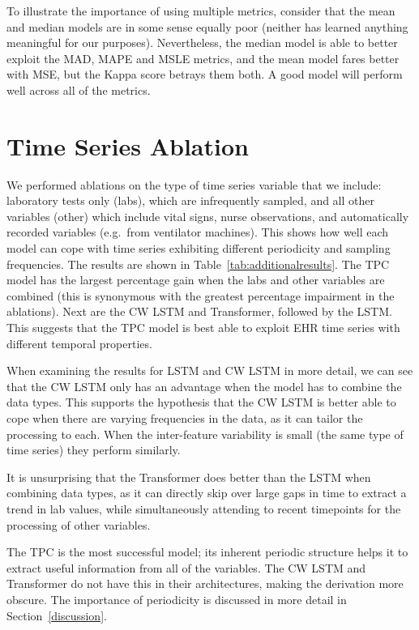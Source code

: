 \documentclass[sigconf]{acmart}
\begin{document}
To illustrate the importance of using multiple metrics, consider that the mean and median models are in some sense equally poor (neither has learned anything meaningful for our purposes). Nevertheless, the median model is able to better exploit the MAD, MAPE and MSLE metrics, and the mean model fares better with MSE, but the Kappa score betrays them both. A good model will perform well across all of the metrics.

\section{Time Series Ablation}
\label{tsablation}

We performed ablations on the type of time series variable that we include: laboratory tests only (labs), which are infrequently sampled, and all other variables (other) which include vital signs, nurse observations, and automatically recorded variables (e.g.\ from ventilator machines). This shows how well each model can cope with time series exhibiting different periodicity and sampling frequencies. The results are shown in Table~\ref{tab:additionalresults}. 
The TPC model has the largest percentage gain when the labs and other variables are combined (this is synonymous with the greatest percentage impairment in the ablations). Next are the CW LSTM and Transformer, followed by the LSTM. This suggests that the TPC model is best able to exploit EHR time series with different temporal properties. 

When examining the results for LSTM and CW LSTM in more detail, we can see that the CW LSTM only has an advantage when the model has to combine the data types. This supports the hypothesis that the CW LSTM is better able to cope when there are varying frequencies in the data, as it can tailor the processing to each. When the inter-feature variability is small (the same type of time series) they perform similarly.

It is unsurprising that the Transformer does better than the LSTM when combining data types, as it can directly skip over large gaps in time to extract a trend in lab values, while simultaneously attending to recent timepoints for the processing of other variables. 

The TPC is the most successful model; its inherent periodic structure helps it to extract useful information from all of the variables. The CW LSTM and Transformer do not have this in their architectures, making the derivation more obscure. The importance of periodicity is discussed in more detail in Section~\ref{discussion}.
\end{document}
